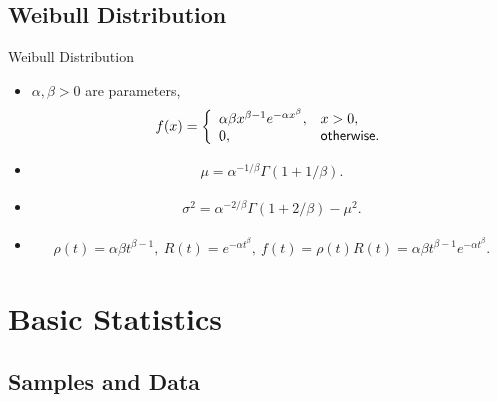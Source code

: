 \subsection{Weibull Distribution}

\begin{frame}{Weibull Distribution}

\begin{itemize}
	\item {} $\alpha, \beta > 0$ are parameters,
	\begin{align*}
	f(x) = \left\{
	\begin{array}{ll}
	\alpha\beta x^{\beta-1} e^{-\alpha x^{\beta}}, & x > 0, \\
	0, & \mathsf{otherwise.}
	\end{array}
	\right.
	\end{align*}
	\item {}
	\begin{align*}
	\mu = \alpha^{-1/\beta} \Gamma(1 + 1/\beta).
	\end{align*}
	\item {}
	\begin{align*}
	\sigma^2 = \alpha^{-2/\beta} \Gamma(1 + 2/\beta) - \mu^2.
	\end{align*}
	\item {}
	\begin{align*}
	\rho(t) = \alpha\beta t^{\beta-1}, \ R(t) = e^{-\alpha t^{\beta}}, \ f(t) = \rho(t)R(t) = \alpha\beta t^{\beta-1}e^{-\alpha t^{\beta}}.
	\end{align*}
\end{itemize}

\end{frame}


\section{Basic Statistics}

\subsection{Samples and Data}


